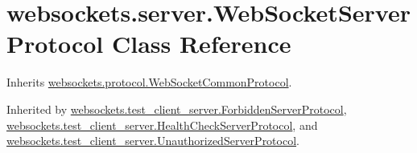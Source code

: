 \hypertarget{classwebsockets_1_1server_1_1_web_socket_server_protocol}{}\section{websockets.\+server.\+Web\+Socket\+Server\+Protocol Class Reference}
\label{classwebsockets_1_1server_1_1_web_socket_server_protocol}


Inherits \hyperlink{classwebsockets_1_1protocol_1_1_web_socket_common_protocol}{websockets.\+protocol.\+Web\+Socket\+Common\+Protocol}.



Inherited by \hyperlink{classwebsockets_1_1test__client__server_1_1_forbidden_server_protocol}{websockets.\+test\+\_\+client\+\_\+server.\+Forbidden\+Server\+Protocol}, \hyperlink{classwebsockets_1_1test__client__server_1_1_health_check_server_protocol}{websockets.\+test\+\_\+client\+\_\+server.\+Health\+Check\+Server\+Protocol}, and \hyperlink{classwebsockets_1_1test__client__server_1_1_unauthorized_server_protocol}{websockets.\+test\+\_\+client\+\_\+server.\+Unauthorized\+Server\+Protocol}.

